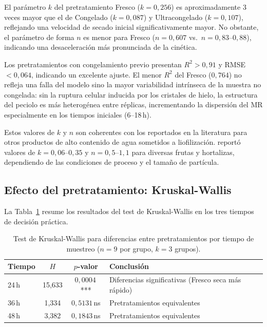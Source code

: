 \documentclass[12pt, a4paper]{article}
\begin{document}
El parámetro $k$ del pretratamiento Fresco ($k = 0{,}256$) es aproximadamente 3 veces mayor que el de Congelado ($k = 0{,}087$) y Ultracongelado ($k = 0{,}107$), reflejando una velocidad de secado inicial significativamente mayor. No obstante, el parámetro de forma $n$ es menor para Fresco ($n = 0{,}607$ vs.\ $n = 0{,}83$--$0{,}88$), indicando una desaceleración más pronunciada de la cinética.

Los pretratamientos con congelamiento previo presentan $R^2 > 0{,}91$ y RMSE $< 0{,}064$, indicando un excelente ajuste. El menor $R^2$ del Fresco ($0{,}764$) no refleja una falla del modelo sino la mayor variabilidad intrínseca de la muestra no congelada: sin la ruptura celular inducida por los cristales de hielo, la estructura del peciolo es más heterogénea entre réplicas, incrementando la dispersión del MR especialmente en los tiempos iniciales (6--18\,h).

Estos valores de $k$ y $n$ son coherentes con los reportados en la literatura para otros productos de alto contenido de agua sometidos a liofilización. \citet{doymaz2004} reportó valores de $k = 0{,}06$--$0{,}35$ y $n = 0{,}5$--$1{,}1$ para diversas frutas y hortalizas, dependiendo de las condiciones de proceso y el tamaño de partícula.

\subsection{Efecto del pretratamiento: Kruskal-Wallis}

La Tabla~\ref{tab:kw} resume los resultados del test de Kruskal-Wallis en los tres tiempos de decisión práctica.

\begin{table}[H]
\centering
\caption{Test de Kruskal-Wallis para diferencias entre pretratamientos por tiempo de muestreo ($n = 9$ por grupo, $k = 3$ grupos).}
\label{tab:kw}
\begin{tabular}{@{}lccl@{}}
\toprule
\textbf{Tiempo} & $H$ & $p$\textbf{-valor} & \textbf{Conclusión} \\
\midrule
24\,h & 15,633 & $0{,}0004$\,*** & Diferencias significativas (Fresco seca más rápido) \\
36\,h &  1,334 & $0{,}5131$\,ns  & Pretratamientos equivalentes \\
48\,h &  3,382 & $0{,}1843$\,ns  & Pretratamientos equivalentes \\
\bottomrule
\end{tabular}
\end{table}
\end{document}
